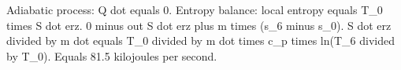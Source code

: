 Adiabatic process: Q dot equals 0.  
Entropy balance: local entropy equals T_0 times S dot erz.  
0 minus out S dot erz plus m times (s_6 minus s_0).  
S dot erz divided by m dot equals T_0 divided by m dot times c_p times ln(T_6 divided by T_0).  
Equals 81.5 kilojoules per second.